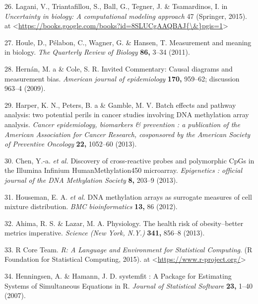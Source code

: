 \documentclass[]{article}
\begin{document}
\hypertarget{ref-Lagani2015}{}
26. Lagani, V., Triantafillou, S., Ball, G., Tegner, J. \& Tsamardinos,
I. in \emph{Uncertainty in biology: A computational modeling approach}
47 (Springer, 2015). at
\textless{}\href{https://books.google.com/books?id=8SLUCgAAQBAJ\%7B/\&\%7Dpgis=1}{https://books.google.com/books?id=8SLUCgAAQBAJ\{\textbackslash{}\&\}pgis=1}\textgreater{}

\hypertarget{ref-Houle2011}{}
27. Houle, D., Pélabon, C., Wagner, G. \& Hansen, T. Measurement and
meaning in biology. \emph{The Quarterly Review of Biology} \textbf{86,}
3--34 (2011).

\hypertarget{ref-Hernan2009}{}
28. Hernán, M. a \& Cole, S. R. Invited Commentary: Causal diagrams and
measurement bias. \emph{American journal of epidemiology} \textbf{170,}
959--62; discussion 963--4 (2009).

\hypertarget{ref-Harper2013}{}
29. Harper, K. N., Peters, B. a \& Gamble, M. V. Batch effects and
pathway analysis: two potential perils in cancer studies involving DNA
methylation array analysis. \emph{Cancer epidemiology, biomarkers \&
prevention : a publication of the American Association for Cancer
Research, cosponsored by the American Society of Preventive Oncology}
\textbf{22,} 1052--60 (2013).

\hypertarget{ref-Chen2013a}{}
30. Chen, Y.-a. \emph{et al.} Discovery of cross-reactive probes and
polymorphic CpGs in the Illumina Infinium HumanMethylation450
microarray. \emph{Epigenetics : official journal of the DNA Methylation
Society} \textbf{8,} 203--9 (2013).

\hypertarget{ref-Houseman2012}{}
31. Houseman, E. A. \emph{et al.} DNA methylation arrays as surrogate
measures of cell mixture distribution. \emph{BMC bioinformatics}
\textbf{13,} 86 (2012).

\hypertarget{ref-Ahima2013}{}
32. Ahima, R. S. \& Lazar, M. A. Physiology. The health risk of
obesity--better metrics imperative. \emph{Science (New York, N.Y.)}
\textbf{341,} 856--8 (2013).

\hypertarget{ref-RCoreTeam2015}{}
33. R Core Team. \emph{R: A Language and Environment for Statistical
Computing}. (R Foundation for Statistical Computing, 2015). at
\textless{}\url{https://www.r-project.org/}\textgreater{}

\hypertarget{ref-Henningsen2007}{}
34. Henningsen, A. \& Hamann, J. D. systemfit : A Package for Estimating
Systems of Simultaneous Equations in R. \emph{Journal of Statistical
Software} \textbf{23,} 1--40 (2007).
\end{document}
